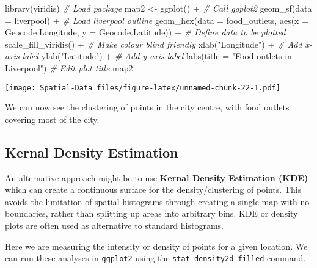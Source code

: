\documentclass[
]{book}
\newenvironment{Shaded}{\begin{snugshade}}{\end{snugshade}}
\newcommand{\AttributeTok}[1]{\textcolor[rgb]{0.77,0.63,0.00}{#1}}
\newcommand{\CommentTok}[1]{\textcolor[rgb]{0.56,0.35,0.01}{\textit{#1}}}
\newcommand{\FunctionTok}[1]{\textcolor[rgb]{0.00,0.00,0.00}{#1}}
\newcommand{\NormalTok}[1]{#1}
\newcommand{\OtherTok}[1]{\textcolor[rgb]{0.56,0.35,0.01}{#1}}
\newcommand{\SpecialCharTok}[1]{\textcolor[rgb]{0.00,0.00,0.00}{#1}}
\newcommand{\StringTok}[1]{\textcolor[rgb]{0.31,0.60,0.02}{#1}}
\begin{document}
\begin{Shaded}
\begin{Highlighting}[]
\FunctionTok{library}\NormalTok{(viridis) }\CommentTok{\# Load package}
\NormalTok{map2 }\OtherTok{\textless{}{-}} \FunctionTok{ggplot}\NormalTok{() }\SpecialCharTok{+} \CommentTok{\# Call ggplot2}
  \FunctionTok{geom\_sf}\NormalTok{(}\AttributeTok{data =}\NormalTok{ liverpool) }\SpecialCharTok{+} \CommentTok{\# Load liverpool outline}
  \FunctionTok{geom\_hex}\NormalTok{(}\AttributeTok{data =}\NormalTok{ food\_outlets, }\FunctionTok{aes}\NormalTok{(}\AttributeTok{x =}\NormalTok{ Geocode.Longitude, }\AttributeTok{y =}\NormalTok{ Geocode.Latitude)) }\SpecialCharTok{+} \CommentTok{\# Define data to be plotted}
  \FunctionTok{scale\_fill\_viridis}\NormalTok{() }\SpecialCharTok{+} \CommentTok{\# Make colour blind friendly}
  \FunctionTok{xlab}\NormalTok{(}\StringTok{"Longitude"}\NormalTok{) }\SpecialCharTok{+} \CommentTok{\# Add x{-}axis label}
  \FunctionTok{ylab}\NormalTok{(}\StringTok{"Latitude"}\NormalTok{) }\SpecialCharTok{+} \CommentTok{\# Add y{-}axis label}
  \FunctionTok{labs}\NormalTok{(}\AttributeTok{title =} \StringTok{"Food outlets in Liverpool"}\NormalTok{) }\CommentTok{\# Edit plot title}
\NormalTok{map2}
\end{Highlighting}
\end{Shaded}

\texttt{[image: Spatial-Data\_files/figure-latex/unnamed-chunk-22-1.pdf]}

We can now see the clustering of points in the city centre, with food outlets covering most of the city.

\hypertarget{kernal-density-estimation}{%
\subsection{Kernal Density Estimation}\label{kernal-density-estimation}}

An alternative approach might be to use \textbf{Kernal Density Estimation (KDE)} which can create a continuous surface for the density/clustering of points. This avoids the limitation of spatial histograms through creating a single map with no boundaries, rather than splitting up areas into arbitrary bins. KDE or density plots are often used as alternative to standard histograms.

Here we are measuring the intensity or density of points for a given location. We can run these analyses in \texttt{ggplot2} using the \texttt{stat\_density2d\_filled} command.
\end{document}
